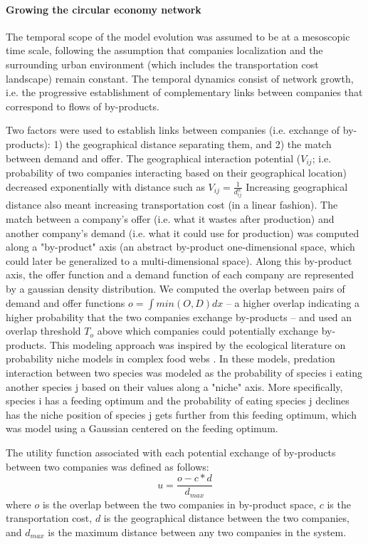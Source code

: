 \documentclass{article}
\begin{document}
\paragraph{Growing the circular economy network}

The temporal scope of the model evolution was assumed to be at a mesoscopic time scale, following the assumption that companies localization and the surrounding urban environment (which includes the transportation cost landscape) remain constant. The temporal dynamics consist of network growth, i.e. the progressive establishment of complementary links between companies that correspond to flows of by-products.

Two factors were used to establish links between companies (i.e. exchange of by-products): 1) the geographical distance separating them, and 2) the match between demand and offer. The geographical interaction potential ($V_{ij}$; i.e. probability of two companies interacting based on their geographical location) decreased exponentially with distance such as $V_{ij}=\frac{1}{d_{ij}^{\alpha}}$ %
Increasing geographical distance also meant increasing transportation cost (in a linear fashion). The match between a company's offer (i.e. what it wastes after production) and another company's demand (i.e. what it could use for production) was computed along a "by-product" axis (an abstract by-product one-dimensional space, which could later be generalized to a multi-dimensional space). Along this by-product axis, the offer function and a demand function of each company are represented by a gaussian density distribution. We computed the overlap between pairs of demand and offer functions \(o = \int min(O,D) dx\) – a higher overlap indicating a higher probability that the two companies exchange by-products – and used an overlap threshold $T_o$ above which companies could potentially exchange by-products. This modeling approach was inspired by the ecological literature on probability niche models in complex food webs \cite{williams2000simple,williams2010probabilistic}. In these models, predation interaction between two species was modeled as the probability of species i eating another species j based on their values along a "niche" axis. More specifically, species i has a feeding optimum and the probability of eating species j declines has the niche position of species j gets further from this feeding optimum, which was model using a Gaussian centered on the feeding optimum. 

The utility function associated with each potential exchange of by-products between two companies was defined as follows:
\[u = \frac{o - c*d}{d_{max}}\]
where $o$ is the overlap between the two companies in by-product space, $c$ is the transportation cost, $d$ is the geographical distance between the two companies, and $d_{max}$ is the maximum distance between any two companies in the system.
\end{document}
